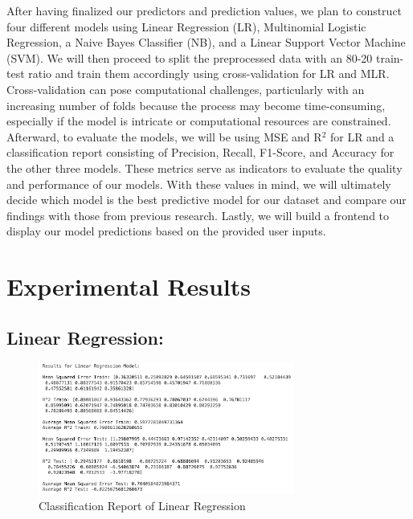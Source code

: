 \documentclass[11pt, letterpaper]{article}
\begin{document}
    \noindent After having finalized our predictors and prediction values, we plan to construct four different models using Linear Regression (LR), Multinomial Logistic Regression, a Naive Bayes Classifier (NB), and a Linear Support Vector Machine (SVM). We will then proceed to split the preprocessed data with an 80-20 train-test ratio and train them accordingly using cross-validation for LR and MLR. Cross-validation can pose computational challenges, particularly with an increasing number of folds because the process may become time-consuming, especially if the model is intricate or computational resources are constrained.\\

    \noindent Afterward, to evaluate the models, we will be using MSE and R$^2$ for LR and a classification report consisting of Precision, Recall, F1-Score, and Accuracy for the other three models. These metrics serve as indicators to evaluate the quality and performance of our models. With these values in mind, we will ultimately decide which model is the best predictive model for our dataset and compare our findings with those from previous research. Lastly, we will build a frontend to display our model predictions based on the provided user inputs.
    
    \section*{Experimental Results}

    \noindent\subsection*{Linear Regression:}

    \begin{figure}[H]
        \centering
        \includegraphics[width=0.75\textwidth]{lr-classification-report.png}
        \caption{Classification Report of Linear Regression}
        \label{fig:class-report-lr}
    \end{figure}
\end{document}
